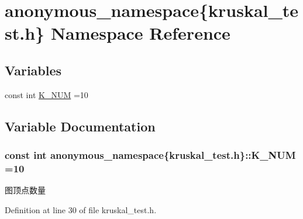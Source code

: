 \hypertarget{namespaceanonymous__namespace_02kruskal__test_8h_03}{}\section{anonymous\+\_\+namespace\{kruskal\+\_\+test.\+h\} Namespace Reference}
\label{namespaceanonymous__namespace_02kruskal__test_8h_03}
\subsection*{Variables}
\begin{DoxyCompactItemize}
\item 
const int \hyperlink{namespaceanonymous__namespace_02kruskal__test_8h_03_afc19c14ae25a06637d837a7cd7cd902a}{K\+\_\+\+N\+U\+M} =10
\end{DoxyCompactItemize}


\subsection{Variable Documentation}
\hypertarget{namespaceanonymous__namespace_02kruskal__test_8h_03_afc19c14ae25a06637d837a7cd7cd902a}{}
\subsubsection[{K\+\_\+\+N\+U\+M}]{\setlength{\rightskip}{0pt plus 5cm}const int anonymous\+\_\+namespace\{kruskal\+\_\+test.\+h\}\+::K\+\_\+\+N\+U\+M =10}\label{namespaceanonymous__namespace_02kruskal__test_8h_03_afc19c14ae25a06637d837a7cd7cd902a}
图顶点数量 

Definition at line 30 of file kruskal\+\_\+test.\+h.

